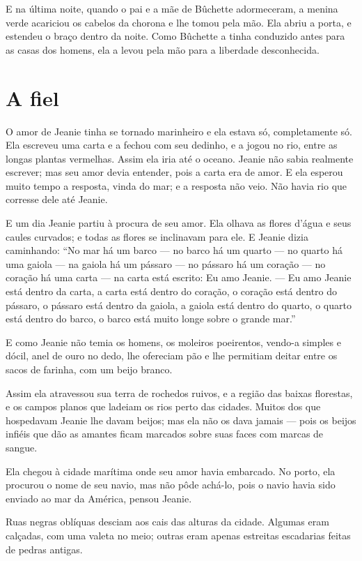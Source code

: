 E na última noite, quando o pai e a mãe de Bûchette adormeceram, a
menina verde acariciou os cabelos da chorona e lhe tomou pela mão. Ela
abriu a porta, e estendeu o braço dentro da noite. Como Bûchette a tinha
conduzido antes para as casas dos homens, ela a levou pela mão para a
liberdade desconhecida.

\section*{A fiel}

O amor de Jeanie tinha se tornado marinheiro e ela estava só,
completamente só. Ela escreveu uma carta e a fechou com seu dedinho, e a
jogou no rio, entre as longas plantas vermelhas. Assim ela iria até o
oceano. Jeanie não sabia realmente escrever; mas seu amor devia entender,
pois a carta era de amor. E ela esperou muito tempo a resposta, vinda do
mar; e a resposta não veio. Não havia rio que corresse dele até Jeanie.

E um dia Jeanie partiu à procura de seu amor. Ela olhava as flores
d’água e seus caules curvados; e todas as flores se inclinavam para ele. E
Jeanie dizia caminhando: “No mar há um barco --- no barco há um quarto --- no
quarto há uma gaiola --- na gaiola há um pássaro --- no pássaro há um coração
--- no coração há uma carta --- na carta está escrito: Eu amo Jeanie. --- Eu amo
Jeanie está dentro da carta, a carta está dentro do coração, o coração
está dentro do pássaro, o pássaro está dentro da gaiola, a gaiola está
dentro do quarto, o quarto está dentro do barco, o barco está muito longe
sobre o grande mar.”

E como Jeanie não temia os homens, os moleiros poeirentos, vendo-a
simples e dócil, anel de ouro no dedo, lhe ofereciam pão e lhe permitiam
deitar entre os sacos de farinha, com um beijo branco.

Assim ela atravessou sua terra de rochedos ruivos, e a região das
baixas florestas, e os campos planos que ladeiam os rios perto das
cidades. Muitos dos que hospedavam Jeanie lhe davam beijos; mas ela não os
dava jamais --- pois os beijos infiéis que dão as amantes ficam marcados
sobre suas faces com marcas de sangue.

Ela chegou à cidade marítima onde seu amor havia embarcado. No porto,
ela procurou o nome de seu navio, mas não pôde achá-lo, pois o navio havia
sido enviado ao mar da América, pensou Jeanie.

Ruas negras oblíquas desciam aos cais das alturas da cidade. Algumas
eram calçadas, com uma valeta no meio; outras eram apenas estreitas
escadarias feitas de pedras antigas.

